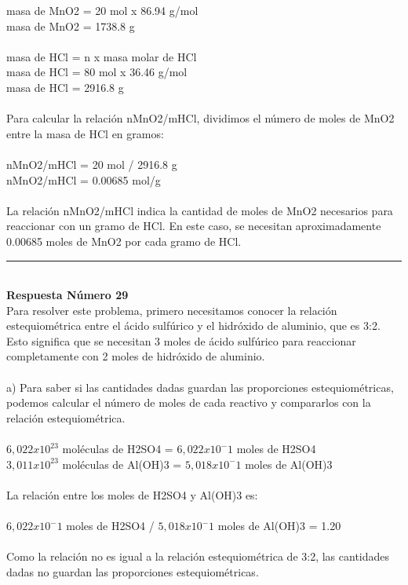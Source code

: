 \documentclass{article}
\begin{document}
masa de MnO2 = 20 mol x 86.94 g/mol\\
masa de MnO2 = 1738.8 g\\
\\
masa de HCl = n x masa molar de HCl\\
masa de HCl = 80 mol x 36.46 g/mol\\
masa de HCl = 2916.8 g\\
\\
Para calcular la relación nMnO2/mHCl, dividimos el número de moles de MnO2 entre la masa de HCl en gramos:\\
\\
nMnO2/mHCl = 20 mol / 2916.8 g\\
nMnO2/mHCl = 0.00685 mol/g\\
\\
La relación nMnO2/mHCl indica la cantidad de moles de MnO2 necesarios para reaccionar con un gramo de HCl. En este caso, se necesitan aproximadamente 0.00685 moles de MnO2 por cada gramo de HCl.\\
\noindent\rule{\textwidth}{1pt} \\
\textbf{Respuesta Número 29} \\
Para resolver este problema, primero necesitamos conocer la relación estequiométrica entre el ácido sulfúrico y el hidróxido de aluminio, que es 3:2. Esto significa que se necesitan 3 moles de ácido sulfúrico para reaccionar completamente con 2 moles de hidróxido de aluminio.\\
\\
a) Para saber si las cantidades dadas guardan las proporciones estequiométricas, podemos calcular el número de moles de cada reactivo y compararlos con la relación estequiométrica.\\
\\
$6,022 x 10^23$ moléculas de H2SO4 = $6,022 x 10^-1$ moles de H2SO4\\
$3,011 x 10^23$ moléculas de Al(OH)3 = $5,018 x 10^-1$ moles de Al(OH)3\\
\\
La relación entre los moles de H2SO4 y Al(OH)3 es:\\
\\
$6,022 x 10^-1$ moles de H2SO4 / $5,018 x 10^-1$ moles de Al(OH)3 = 1.20\\
\\
Como la relación no es igual a la relación estequiométrica de 3:2, las cantidades dadas no guardan las proporciones estequiométricas.\\
\\
\end{document}
